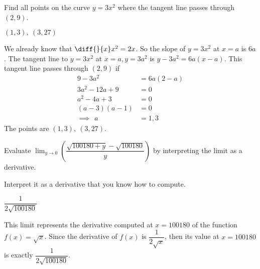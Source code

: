 \begin{question}[1997D]Find all points on the curve $y=3x^2$ where the tangent
line passes through $(2,9)$.
\end{question}
\begin{answer}{$(1,3),\ (3,27)$}
\end{answer}
\begin{solution}
We already know that $\diff{}{x}x^2=2x$. So
the slope of $y=3x^2$ at $x=a$ is $6a$. The tangent line to
$y=3x^2$ at $x=a, y=3a^2$ is $y-3a^2=6a(x-a)$. This tangent line passes
through $(2,9)$ if
\begin{align*}
9-3a^2&=6a(2-a)\\
 3a^2-12a+9&=0\\
  a^2-4a+3&=0\\
  (a-3)(a-1)&=0\\
\implies~~a&=1,3
\end{align*}
The points are {$(1,3),\ (3,27)$}.
\end{solution}

\begin{Mquestion}[2015Q]
Evaluate $\displaystyle \lim_{y\rightarrow 0}\left(
\dfrac{\sqrt{100180+y}-\sqrt{100180}}{y}\right)$ by interpreting the limit as a derivative.
\end{Mquestion}
\begin{hint} Interpret it as a derivative that you know how to compute.
\end{hint}
\begin{answer} $\dfrac{1}{2\sqrt{100180}}$
\end{answer}
\begin{solution} This limit represents the derivative computed at $x=100180$ of the function
$f(x)=\sqrt{x}$. Since the derivative of $f(x)$ is $\dfrac{1}{2\sqrt{x}}$, then
its value at $x=100180$ is exactly $\dfrac{1}{2\sqrt{100180}}$.
\end{solution}



